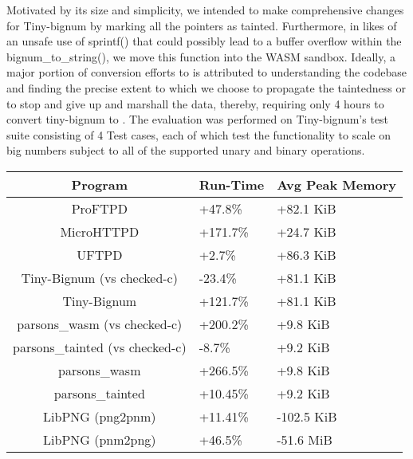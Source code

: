 Motivated by its size and simplicity, we intended to make comprehensive \systemname changes for Tiny-bignum by marking all the pointers as tainted. Furthermore, in likes of an unsafe use of sprintf() that could possibly lead to a buffer overflow within the bignum\_to\_string(), we move this function into the WASM sandbox. Ideally, a major portion of conversion efforts to \systemname is attributed to understanding the codebase and finding the precise extent to which we choose to propagate the taintedness or to stop and give up and marshall the data, thereby, requiring only 4 hours to convert tiny-bignum to \systemname. The evaluation was performed on Tiny-bignum's test suite consisting of 4 Test cases, each of which test the functionality to scale on big numbers subject to all of the supported unary and binary operations.  

\begin{center}
\begin{tabular}{||c | p{1.3cm} | p{1.8cm}||} 
 \hline
 Program & Run-Time & Avg Peak Memory \\ [0.5ex] 
 \hline\hline
 ProFTPD & +47.8\% & +82.1 KiB  \\
 MicroHTTPD & +171.7\% & +24.7 KiB\\ 
 UFTPD & +2.7\% & +86.3 KiB \\ 
 Tiny-Bignum (vs checked-c) & -23.4\% &  +81.1 KiB \\
 Tiny-Bignum &  +121.7\% &  +81.1 KiB \\
 parsons\_wasm (vs checked-c) & +200.2\% & +9.8 KiB\\ 
 parsons\_tainted (vs checked-c) & -8.7\% & +9.2 KiB\\
 parsons\_wasm & +266.5\% & +9.8 KiB\\ 
 parsons\_tainted & +10.45\% & +9.2 KiB\\ 
 LibPNG (png2pnm) & +11.41\% & -102.5 KiB\\ 
 LibPNG (pnm2png) & +46.5\% & -51.6 MiB\\ [1ex]
 \hline 
\end{tabular}
\end{center}


